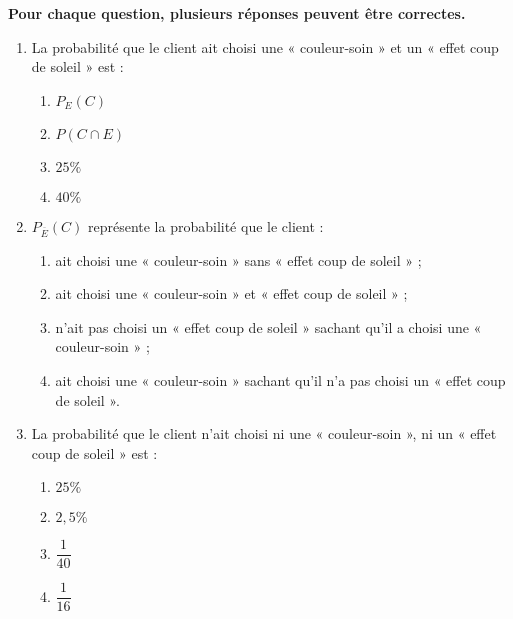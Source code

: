 \documentclass[a4paper,11pt,exos]{nsi} %
\begin{document}
\textbf{Pour chaque question, plusieurs réponses peuvent être correctes.}
\begin{enumerate}
    \item La probabilité que le client ait choisi une « couleur-soin » et un « effet coup de soleil » est :
    \begin{multicols}{4}
        \begin{enumerate}[label=]
            \item {} $P_E(C)$
            \item \textcolor{UGLiBlue}{ $P(C \cap E)$}
            \item \textcolor{UGLiBlue}{ $25 \%$}
            \item {} $40\%$
        \end{enumerate}
    \end{multicols}

    \item $P_{\overline{E}}(C)$ représente la probabilité que le client :
    \begin{enumerate}[label=]
        \item {} ait  choisi une « couleur-soin » sans « effet coup de soleil » ;
        \item {} ait  choisi une « couleur-soin » et « effet coup de soleil » ;
        \item {} n'ait pas choisi un « effet coup de soleil » sachant qu'il a choisi une « couleur-soin » ;
        \item \textcolor{UGLiBlue}{ ait choisi une « couleur-soin » sachant qu'il n'a pas choisi un « effet coup de soleil ».}   
    \end{enumerate}

    \item La probabilité que le client n'ait choisi ni une « couleur-soin », ni un « effet coup de soleil » est :
    \begin{multicols}{4}
        \begin{enumerate}[label=]
            \item {} $25 \%$
            \item \textcolor{UGLiBlue}{ $2,5 \%$}
            \item \textcolor{UGLiBlue}{  $\dfrac{1}{40}$}
            \item {} $\dfrac{1}{16}$
        \end{enumerate}
    \end{multicols}
\end{enumerate}
\end{document}
